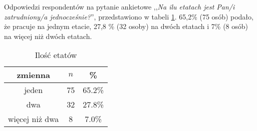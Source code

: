 Odpowiedzi respondentów na pytanie ankietowe ,,\textit{Na ilu etatach jest Pan/i zatrudniony/a jednocześnie?}'', przedstawiono w tabeli \ref{tab:Q2}. 
65,2\% (75 osób) podało, że pracuje na jednym etacie, 27,8 \% (32 osoby) na dwóch etatach i 7\% (8 osób) na więcej niż dwóch etatach.

\begin{table}[H]
\caption{Ilość etatów}
\centering
\begin{tabular}{ | c | c | c |}
\hline
zmienna & $n$ & \% \\
\hline
jeden  &  75  & 65.2\% \\
\hline
dwa  &  32  & 27.8\% \\
\hline
więcej niż dwa  &  8  & 7.0\% \\
\hline
\end{tabular}
\label{tab:Q2}
\end{table}


